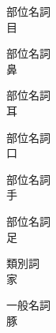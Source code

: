 \item[kuku]
    部位名詞\\
    目
\item[uai]
    部位名詞\\
    鼻
\item[vuvu]
    部位名詞\\
    耳
\item[iatu]
    部位名詞\\
    口
\item[tue]
    部位名詞\\
    手
\item[aopa]
    部位名詞\\
    足
\item[paiai]
    類別詞\\
    家
\item[kuaia]
    一般名詞\\
    豚
